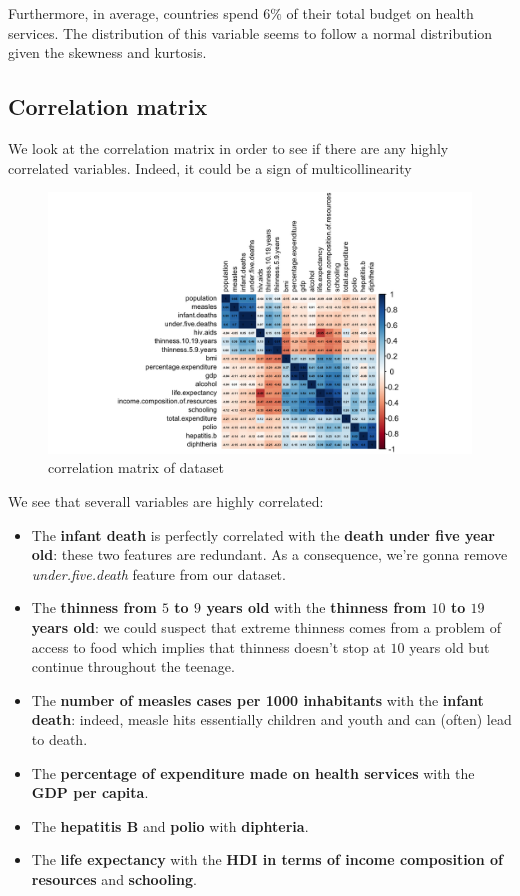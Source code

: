 Furthermore, in average, countries spend $6 \%$ of their total budget on health services. The distribution of this variable seems to follow a normal distribution given the skewness and kurtosis.

\subsection{Correlation matrix}

We look at the correlation matrix in order to see if there are any highly correlated variables. Indeed, it could be a sign of multicollinearity

\begin{figure}[H]
	\centering
	\includegraphics{figures/eda/correlation_matrix.png}
	\caption{correlation matrix of dataset}
	\label{fig:correlation_matrix}
\end{figure}

We see that severall variables are highly correlated:
\begin{itemize}
	\item The \textbf{infant death} is perfectly correlated with the \textbf{death under five year old}: these two features are redundant. As a consequence, we're gonna remove \textit{under.five.death} feature from our dataset.
	\item The \textbf{thinness from $5$ to $9$ years old} with the \textbf{thinness from $10$ to $19$ years old}: we could suspect that extreme thinness comes from a problem of access to food which implies that thinness doesn't stop at $10$ years old but continue throughout the teenage.
	\item The \textbf{number of measles cases per 1000 inhabitants} with the \textbf{infant death}: indeed, measle hits essentially children and youth and can (often) lead to death.
	\item The \textbf{percentage of expenditure made on health services} with the \textbf{GDP per capita}.
	\item The \textbf{hepatitis B} and \textbf{polio} with \textbf{diphteria}.
	\item The \textbf{life expectancy} with the \textbf{HDI in terms of income composition of resources} and \textbf{schooling}.
\end{itemize}